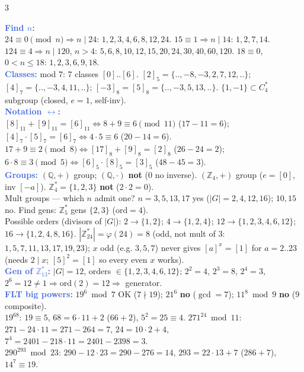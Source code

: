 \documentclass[9pt]{extarticle}
\newcommand{\hl}[1]{\textbf{\textcolor{BrickRed}{#1}}}
\newcommand{\ex}[1]{\textbf{\textcolor{RoyalBlue}{#1}}}
\begin{document}
\begin{multicols}{3}
\begin{sloppypar}
\ex{Find $n$:}\\
$24\equiv0\pmod n\Rightarrow n{\mid}24$: $1,2,3,4,6,8,12,24$. $15\equiv1\Rightarrow n{\mid}14$: $1,2,7,14$.\\
$124\equiv4\Rightarrow n{\mid}120$, $n{>}4$: $5,6,8,10,12,15,20,24,30,40,60,120$. $18\equiv0$, $0{<}n{\le}18$: $1,2,3,6,9,18$.\\
\ex{Classes:} mod $7$: $7$ classes $[0]{..}[6]$. $[2]_5{=}\{..,{-}8,{-}3,2,7,12,..\}$; $[4]_7{=}\{..,{-}3,4,11,..\}$; $[{-}3]_8{=}[5]_8{=}\{..,{-}3,5,13,..\}$. $\{1,{-}1\}{\subset}C_4^*$ subgroup (closed, $e{=}1$, self-inv).\\
\ex{Notation ${\leftrightarrow}$:}\\
$[8]_{11}{+}[9]_{11}{=}[6]_{11}\iff8{+}9\equiv6\pmod{11}$ ($17{-}11{=}6$); $[4]_7{\cdot}[5]_7{=}[6]_7\iff4{\cdot}5\equiv6$ ($20{-}14{=}6$).\\
$17{+}9\equiv2\pmod8\iff[17]_8{+}[9]_8{=}[2]_8$ ($26{-}24{=}2$); $6{\cdot}8\equiv3\pmod5\iff[6]_5{\cdot}[8]_5{=}[3]_5$ ($48{-}45{=}3$).\\
\ex{Groups:} $(\mathbb Q,{+})$ group; $(\mathbb Q,{\cdot})$ \hl{not} ($0$ no inverse). $(\mathbb Z_4,{+})$ group ($e{=}[0]$, inv $[-a]$). $\mathbb Z_4^*{=}\{1,2,3\}$ \hl{not} ($2{\cdot}2{=}0$).\\
Mult groups — which $n$ admit one? $n{=}3,5,13,17$ yes ($|G|{=}2,4,12,16$); $10,15$ no. Find gens: $\mathbb Z_5^*$ gens $\{2,3\}$ ($\mathrm{ord}{=}4$).\\
Possible orders (divisors of $|G|$): $2{\to}\{1,2\}$; $4{\to}\{1,2,4\}$; $12{\to}\{1,2,3,4,6,12\}$; $16{\to}\{1,2,4,8,16\}$. $|\mathbb Z_{24}^*|{=}\varphi(24){=}8$ (odd, not mult of $3$: $1,5,7,11,13,17,19,23$); $x$ odd (e.g. $3,5,7$) never gives $[a]^x{=}[1]$ for $a{=}2..23$ (needs $2{\mid}x$; $[5]^2{=}[1]$ so every even $x$ works).\\
\ex{Gen of $\mathbb Z_{13}^*$:} $|G|{=}12$, orders ${\in}\{1,2,3,4,6,12\}$; $2^2{=}4$, $2^3{=}8$, $2^4{=}3$, $2^6{=}12{\ne}1\Rightarrow\mathrm{ord}(2){=}12\Rightarrow$ generator.\\
\ex{FLT big powers:} $19^6\bmod7$ OK ($7{\nmid}19$); $21^6$ \hl{no} ($\gcd{=}7$); $11^8\bmod9$ \hl{no} ($9$ composite).\\
$19^{68}$: $19\equiv5$, $68{=}6{\cdot}11{+}2$ ($66{+}2$), $5^2{=}25\equiv4$. $271^{24}\bmod11$: $271{-}24{\cdot}11{=}271{-}264{=}7$, $24{=}10{\cdot}2{+}4$, $7^4{=}2401{-}218{\cdot}11{=}2401{-}2398{=}3$.\\
$290^{293}\bmod23$: $290{-}12{\cdot}23{=}290{-}276{=}14$, $293{=}22{\cdot}13{+}7$ ($286{+}7$), $14^7\equiv19$.\\

\end{sloppypar}
\end{multicols}
\end{document}
